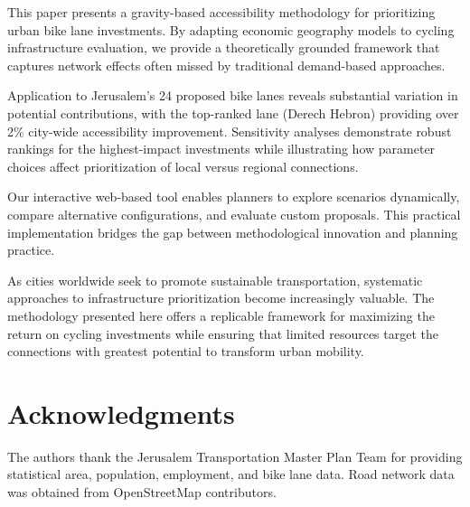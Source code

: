 \documentclass[12pt,a4paper]{article}
\begin{document}
This paper presents a gravity-based accessibility methodology for prioritizing urban bike lane investments. By adapting economic geography models to cycling infrastructure evaluation, we provide a theoretically grounded framework that captures network effects often missed by traditional demand-based approaches.

Application to Jerusalem's 24 proposed bike lanes reveals substantial variation in potential contributions, with the top-ranked lane (Derech Hebron) providing over 2\% city-wide accessibility improvement. Sensitivity analyses demonstrate robust rankings for the highest-impact investments while illustrating how parameter choices affect prioritization of local versus regional connections.

Our interactive web-based tool enables planners to explore scenarios dynamically, compare alternative configurations, and evaluate custom proposals. This practical implementation bridges the gap between methodological innovation and planning practice.

As cities worldwide seek to promote sustainable transportation, systematic approaches to infrastructure prioritization become increasingly valuable. The methodology presented here offers a replicable framework for maximizing the return on cycling investments while ensuring that limited resources target the connections with greatest potential to transform urban mobility.

\section*{Acknowledgments}

The authors thank the Jerusalem Transportation Master Plan Team for providing statistical area, population, employment, and bike lane data. Road network data was obtained from OpenStreetMap contributors.


\end{document}
